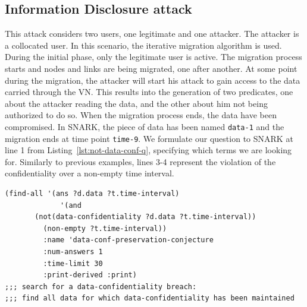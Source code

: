 \subsection{Information Disclosure attack}
This attack considers two users, one legitimate and one attacker.
The attacker is a collocated user.
In this scenario, the iterative migration algorithm is used.
During the initial phase, only the legitimate user is active.
The migration process starts and nodes and links are being migrated, one after another.
At some point during the migration, the attacker will start his attack to gain access to the data carried through the VN.
This results into the generation of two predicates, one about the attacker reading the data, and the other about him not being authorized to do so. 
When the migration process ends, the data have been compromised.
In SNARK, the piece of data has been named \verb'data-1' and the migration ends at time point \verb'time-9'.
We formulate our question to SNARK at line 1 from Listing~\ref{lst:not-data-conf-q}, specifying which terms we are looking for.
Similarly to previous examples, lines 3-4 represent the violation of the confidentiality over a non-empty time interval.

\begin{lstlisting}[caption=SNARK question to detect the data confidentiality violation., label=lst:not-data-conf-q,captionpos=b] 
   (find-all '(ans ?d.data ?t.time-interval)
             '(and
       (not(data-confidentiality ?d.data ?t.time-interval))
         (non-empty ?t.time-interval))
         :name 'data-conf-preservation-conjecture
         :num-answers 1
         :time-limit 30
         :print-derived :print)
;;; search for a data-confidentiality breach:
;;; find all data for which data-confidentiality has been maintained

\end{lstlisting}

